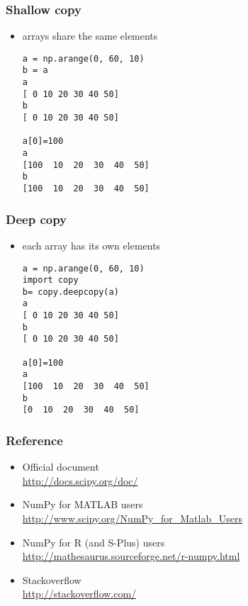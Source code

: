 \documentclass{beamer}
\begin{document}
\begin{frame}[fragile]
\frametitle{Shallow copy}
\begin{itemize}
\item arrays share the same elements
\begin{lstlisting}
a = np.arange(0, 60, 10)
b = a
a
[ 0 10 20 30 40 50]
b
[ 0 10 20 30 40 50]

a[0]=100
a
[100  10  20  30  40  50]
b
[100  10  20  30  40  50]
\end{lstlisting}
\end{itemize}
\end{frame}

\begin{frame}[fragile]
\frametitle{Deep copy}
\begin{itemize}
\item each array has its own elements
\begin{lstlisting}
a = np.arange(0, 60, 10)
import copy
b= copy.deepcopy(a)
a
[ 0 10 20 30 40 50]
b
[ 0 10 20 30 40 50]

a[0]=100
a
[100  10  20  30  40  50]
b
[0  10  20  30  40  50]
\end{lstlisting}
\end{itemize}
\end{frame}

\begin{frame}[fragile]
\frametitle{Reference}
\begin{itemize}
\item Official document \\
\url{http://docs.scipy.org/doc/}
\item NumPy for MATLAB users \\
\url{http://www.scipy.org/NumPy_for_Matlab_Users}
\item NumPy for R (and S-Plus) users \\
\url{http://mathesaurus.sourceforge.net/r-numpy.html}
\item Stackoverflow \\
\url{http://stackoverflow.com/}
\end{itemize}
\end{frame}
\end{document}
